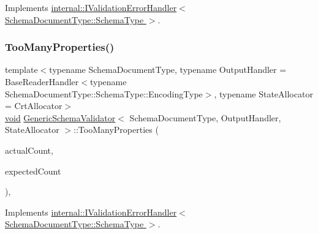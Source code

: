 Implements \hyperlink{classinternal_1_1IValidationErrorHandler_a9371ca15622897a429971f69c07c47ef}{internal\+::\+I\+Validation\+Error\+Handler$<$ Schema\+Document\+Type\+::\+Schema\+Type $>$}.

\mbox{\label{classGenericSchemaValidator_ad7ca0a327420c110e9ee6e70b2cdbc87}} 
\subsubsection{\texorpdfstring{Too\+Many\+Properties()}{TooManyProperties()}}
{\footnotesize\ttfamily template$<$typename Schema\+Document\+Type, typename Output\+Handler = Base\+Reader\+Handler$<$typename Schema\+Document\+Type\+::\+Schema\+Type\+::\+Encoding\+Type$>$, typename State\+Allocator = Crt\+Allocator$>$ \\
\hyperlink{imgui__impl__opengl3__loader_8h_ac668e7cffd9e2e9cfee428b9b2f34fa7}{void} \hyperlink{classGenericSchemaValidator}{Generic\+Schema\+Validator}$<$ Schema\+Document\+Type, Output\+Handler, State\+Allocator $>$\+::Too\+Many\+Properties (\begin{DoxyParamCaption}\item[{\hyperlink{rapidjson_8h_a5ed6e6e67250fadbd041127e6386dcb5}{Size\+Type}}]{actual\+Count,  }\item[{\hyperlink{rapidjson_8h_a5ed6e6e67250fadbd041127e6386dcb5}{Size\+Type}}]{expected\+Count }\end{DoxyParamCaption})\hspace{0.3cm}{\ttfamily [inline]}, {\ttfamily [virtual]}}



Implements \hyperlink{classinternal_1_1IValidationErrorHandler_a3494e9d2bff94979649e186aba71b32e}{internal\+::\+I\+Validation\+Error\+Handler$<$ Schema\+Document\+Type\+::\+Schema\+Type $>$}.

\mbox{\label{classGenericSchemaValidator_a7711071f95ead18c0dd99f69c09a4c11}} 
